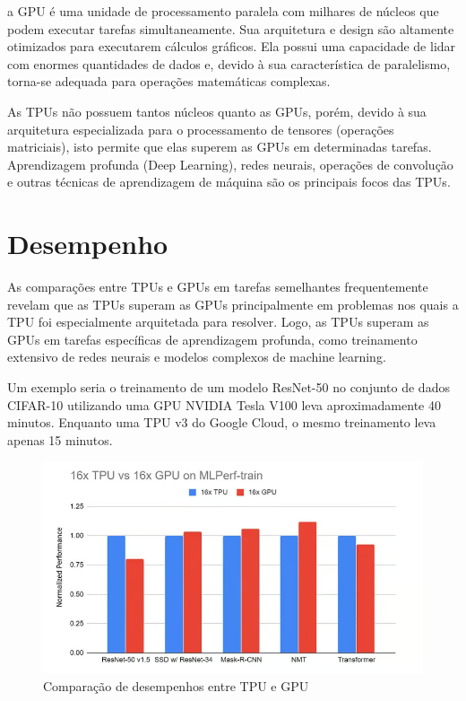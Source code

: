 \documentclass{report}
\begin{document}
a GPU é uma unidade de processamento paralela com milhares de núcleos que podem executar tarefas simultaneamente. Sua arquitetura e design são altamente otimizados para executarem cálculos gráficos. Ela possui uma capacidade de lidar com enormes quantidades de dados e, devido à sua característica de paralelismo, torna-se adequada para operações matemáticas complexas.

As TPUs não possuem tantos núcleos quanto as GPUs, porém, devido à sua arquitetura especializada para o processamento de tensores (operações matriciais), isto permite que elas superem as GPUs em determinadas tarefas. Aprendizagem profunda (Deep Learning), redes neurais, operações de convolução e outras técnicas de aprendizagem de máquina são os principais focos das TPUs.

\section{Desempenho}

As comparações entre TPUs e GPUs em tarefas semelhantes frequentemente revelam que as TPUs superam as GPUs principalmente em problemas nos quais a TPU foi especialmente arquitetada para resolver. Logo,  as TPUs superam as GPUs em tarefas específicas de aprendizagem profunda, como treinamento extensivo de redes neurais e modelos complexos de machine learning.

Um exemplo seria o treinamento de um modelo ResNet-50 no conjunto de dados CIFAR-10 utilizando uma GPU NVIDIA Tesla V100 leva aproximadamente 40 minutos. Enquanto uma TPU v3 do Google Cloud, o mesmo treinamento leva apenas 15 minutos.

\begin{figure}[h]
	\includegraphics[scale=0.7]{Desempenho}
	\centering
	\caption{Comparação de desempenhos entre TPU e GPU}
\end{figure}
\end{document}
